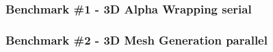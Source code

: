 

\subsubsection{Benchmark \#1 - 3D Alpha Wrapping serial}




\subsubsection{Benchmark \#2 - 3D Mesh Generation parallel}

